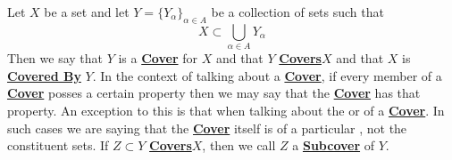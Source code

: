 \newcommand{\Cover}[0]{\textbf{\hyperref[def:Cover]{Cover}}\xspace}
\newcommand{\CoveredBy}[0]{\textbf{\hyperref[def:Cover]{Covered By}}\xspace}
\newcommand{\Covers}[0]{\textbf{\hyperref[def:Cover]{Covers}}\xspace}
\newcommand{\Subcover}[0]{\textbf{\hyperref[def:Cover]{Subcover}}\xspace}
\newcommand{\Subcovers}[0]{\textbf{\hyperref[def:Cover]{Subcovers}}\xspace}
\begin{df}
\label{def:Cover}
\rm
    Let $X$ be a set and let 
    $Y=\{Y_\alpha\}_{\alpha \in A}$ 
	be a collection of sets
    such that 
    \begin{equation*}
        X \subset \bigcup_{\alpha \in A} Y_{\alpha}
    \end{equation*}
    Then we say that 
    $Y$ 
    is a 
    \Cover
    for $X$ 
    and that $Y$ 
    \Covers $X$
	and that $X$ 
	is \CoveredBy
	$Y$. 
    In the context of talking about a 
    \Cover, if every member of a 
    \Cover posses a certain property
    then we may say that the \Cover 
    has that property. 
	An exception to this is that 
    when talking about the 
    \Cardinality
    or \Disjointedness 
    of a \Cover.
	In such cases we are saying
	that the \Cover itself is 
	\Disjoint of a particular 
	\Cardinality, not the 
	constituent sets. 
    If $Z \subset Y$ \Covers $X$, then
    we call $Z$ a \Subcover of $Y$. 
\end{df}
